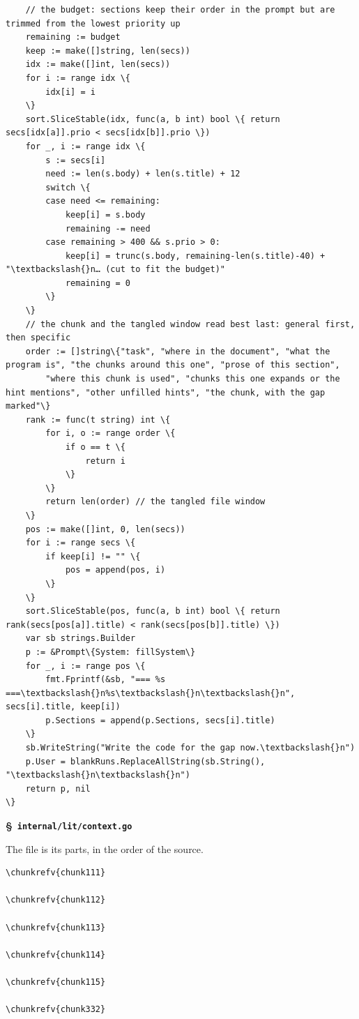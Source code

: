 \documentclass[10pt,a4paper]{article}
\makeatletter
\newcounter{chunk}
\renewcommand{\thechunk}{\S\arabic{chunk}}
\newcommand{\chunkhead}[2]{\par\addvspace{1.2ex}\noindent\refstepcounter{chunk}\label{#1}{\bfseries\thechunk}\enspace #2\par\nopagebreak}
\newcommand{\chunkrefv}[1]{\hyperref[#1]{\ensuremath{\langle}\csname cn@#1\endcsname\ensuremath{\rangle}\textsuperscript{\ref*{#1}}}}
\newcommand{\filebadge}{{\footnotesize\itshape\color{tuftegray}file}}
\makeatother
\begin{document}
\begin{Verbatim}
	// the budget: sections keep their order in the prompt but are trimmed from the lowest priority up
	remaining := budget
	keep := make([]string, len(secs))
	idx := make([]int, len(secs))
	for i := range idx \{
		idx[i] = i
	\}
	sort.SliceStable(idx, func(a, b int) bool \{ return secs[idx[a]].prio < secs[idx[b]].prio \})
	for _, i := range idx \{
		s := secs[i]
		need := len(s.body) + len(s.title) + 12
		switch \{
		case need <= remaining:
			keep[i] = s.body
			remaining -= need
		case remaining > 400 && s.prio > 0:
			keep[i] = trunc(s.body, remaining-len(s.title)-40) + "\textbackslash{}n… (cut to fit the budget)"
			remaining = 0
		\}
	\}
	// the chunk and the tangled window read best last: general first, then specific
	order := []string\{"task", "where in the document", "what the program is", "the chunks around this one", "prose of this section",
		"where this chunk is used", "chunks this one expands or the hint mentions", "other unfilled hints", "the chunk, with the gap marked"\}
	rank := func(t string) int \{
		for i, o := range order \{
			if o == t \{
				return i
			\}
		\}
		return len(order) // the tangled file window
	\}
	pos := make([]int, 0, len(secs))
	for i := range secs \{
		if keep[i] != "" \{
			pos = append(pos, i)
		\}
	\}
	sort.SliceStable(pos, func(a, b int) bool \{ return rank(secs[pos[a]].title) < rank(secs[pos[b]].title) \})
	var sb strings.Builder
	p := &Prompt\{System: fillSystem\}
	for _, i := range pos \{
		fmt.Fprintf(&sb, "=== %s ===\textbackslash{}n%s\textbackslash{}n\textbackslash{}n", secs[i].title, keep[i])
		p.Sections = append(p.Sections, secs[i].title)
	\}
	sb.WriteString("Write the code for the gap now.\textbackslash{}n")
	p.User = blankRuns.ReplaceAllString(sb.String(), "\textbackslash{}n\textbackslash{}n")
	return p, nil
\}
\end{Verbatim}

\chunkhead{chunk116}{\filebadge\ \textbf{\texttt{internal/\allowbreak{}lit/\allowbreak{}context.\allowbreak{}go}}}
The file is its parts, in the order of the source.
\begin{Verbatim}
\chunkrefv{chunk111}

\chunkrefv{chunk112}

\chunkrefv{chunk113}

\chunkrefv{chunk114}

\chunkrefv{chunk115}

\chunkrefv{chunk332}
\end{Verbatim}

\hypertarget{h-Gaps-for-the-assistant-sanity-checks}{}
\end{document}
